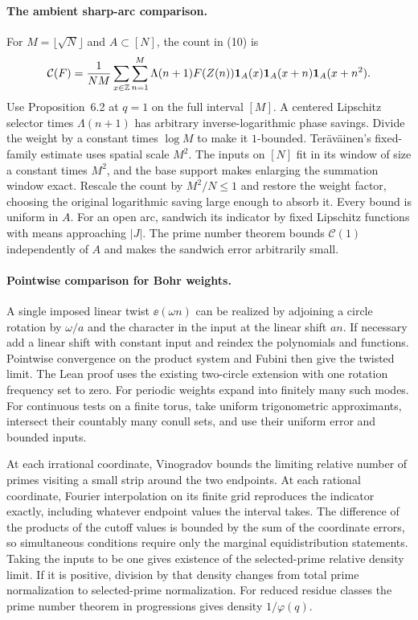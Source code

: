 \paragraph{The ambient sharp-arc comparison.}
For $M=\lfloor\sqrt N\rfloor$ and $A\subset[N]$, the count in (10) is
\[
 \mathcal C(F)=\frac1{NM}\sum_{x\in\mathbb Z}\sum_{n=1}^M
  \Lambda(n+1)F(Z(n))\mathbf 1_A(x)\mathbf 1_A(x+n)\mathbf 1_A(x+n^2).
\]
Use Proposition~6.2 at $q=1$
on the full interval $[M]$. A centered Lipschitz selector times
$\Lambda(n+1)$ has arbitrary inverse-logarithmic phase savings.
Divide the weight by a constant times $\log M$ to make it
$1$-bounded. Ter\"av\"ainen's fixed-family estimate uses spatial
scale $M^2$. The inputs on $[N]$ fit in its window of size a
constant times $M^2$, and the base support makes enlarging the
summation window exact. Rescale the count by $M^2/N\le1$ and
restore the weight factor, choosing the original logarithmic
saving large enough to absorb it. Every bound is uniform in
$A$. For an open arc, sandwich its indicator by fixed Lipschitz
functions with means approaching $|J|$. The prime number theorem
bounds $\mathcal C(1)$ independently of $A$ and makes the
sandwich error arbitrarily small.

\paragraph{Pointwise comparison for Bohr weights.}
A single imposed linear twist $\ee(\omega n)$ can be
realized by adjoining a circle rotation by $\omega/a$
and the character in the input at the linear shift $an$.
If necessary add a linear shift with constant input and
reindex the polynomials and functions. Pointwise convergence
on the product system and Fubini then give the twisted limit.
The Lean proof uses the existing two-circle extension with
one rotation frequency set to zero.
For periodic weights expand into finitely many such modes.
For continuous tests on a finite torus, take uniform trigonometric
approximants, intersect their countably many conull sets, and
use their uniform error and bounded inputs.

At each irrational coordinate, Vinogradov bounds the limiting
relative number of primes visiting a small strip around the
two endpoints. At each rational coordinate, Fourier interpolation
on its finite grid reproduces the indicator exactly, including
whatever endpoint values the interval takes. The difference of
the products of the cutoff values is bounded by the sum of the
coordinate errors, so simultaneous conditions require only the
marginal equidistribution statements. Taking the inputs to be
one gives existence of the selected-prime relative density
limit. If it is positive, division by that density changes
from total prime normalization to selected-prime normalization.
For reduced residue classes the prime number theorem in
progressions gives density $1/\varphi(q)$.

